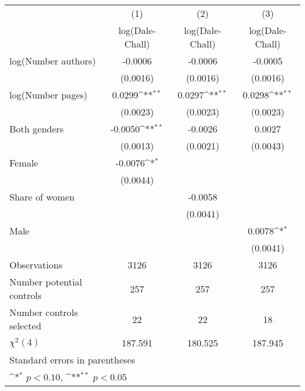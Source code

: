 {
\def\sym#1{\ifmmode^{#1}\else\(^{#1}\)\fi}
\begin{tabular}{l*{3}{c}}
\hline\hline
                    &\multicolumn{1}{c}{(1)}&\multicolumn{1}{c}{(2)}&\multicolumn{1}{c}{(3)}\\
                    &\multicolumn{1}{c}{log(Dale-Chall)}&\multicolumn{1}{c}{log(Dale-Chall)}&\multicolumn{1}{c}{log(Dale-Chall)}\\
\hline
\hspace{3mm}log(Number authors)&     -0.0006        &     -0.0006        &     -0.0005        \\
                    &    (0.0016)        &    (0.0016)        &    (0.0016)        \\
[1em]
\hspace{3mm}log(Number pages)&      0.0299\sym{**}&      0.0297\sym{**}&      0.0298\sym{**}\\
                    &    (0.0023)        &    (0.0023)        &    (0.0023)        \\
[1em]
\hspace{3mm}Both genders&     -0.0050\sym{**}&     -0.0026        &      0.0027        \\
                    &    (0.0013)        &    (0.0021)        &    (0.0043)        \\
[1em]
\hspace{3mm}Female  &     -0.0076\sym{*} &                    &                    \\
                    &    (0.0044)        &                    &                    \\
[1em]
\hspace{3mm}Share of women&                    &     -0.0058        &                    \\
                    &                    &    (0.0041)        &                    \\
[1em]
\hspace{3mm}Male    &                    &                    &      0.0078\sym{*} \\
                    &                    &                    &    (0.0041)        \\
\hline
Observations        &        3126        &        3126        &        3126        \\
Number potential controls&         257        &         257        &         257        \\
Number controls selected&          22        &          22        &          18        \\
$\chi^2(4)$         &     187.591        &     180.525        &     187.945        \\
\hline\hline
\multicolumn{4}{l}{\footnotesize Standard errors in parentheses}\\
\multicolumn{4}{l}{\footnotesize \sym{*} \(p<0.10\), \sym{**} \(p<0.05\)}\\
\end{tabular}
}
